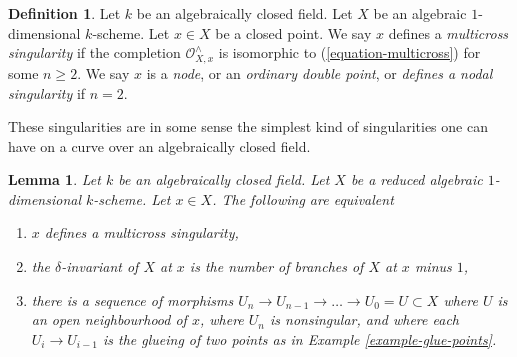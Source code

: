\documentclass{stacks-project}
\theoremstyle{plain}
\newtheorem{lemma}[subsection]{Lemma}
\theoremstyle{definition}
\newtheorem{definition}[subsection]{Definition}
\theoremstyle{remark}
\numberwithin{equation}{subsection}
\begin{document}
\begin{definition}
\label{definition-multicross}
Let $k$ be an algebraically closed field. Let $X$ be an algebraic
$1$-dimensional $k$-scheme. Let $x \in X$ be a closed point.
We say $x$ defines a {\it multicross singularity} if the completion
$\mathcal{O}_{X, x}^\wedge$
is isomorphic to (\ref{equation-multicross}) for some $n \geq 2$.
We say $x$ is a {\it node}, or an {\it ordinary double point}, or
{\it defines a nodal singularity} if $n = 2$.
\end{definition}

\noindent
These singularities are in some sense the simplest kind of singularities
one can have on a curve over an algebraically closed field.

\begin{lemma}
\label{lemma-multicross}
Let $k$ be an algebraically closed field. Let $X$ be a reduced algebraic
$1$-dimensional $k$-scheme. Let $x \in X$. The following are equivalent
\begin{enumerate}
\item $x$ defines a multicross singularity,
\item the $\delta$-invariant of $X$ at $x$ is the
number of branches of $X$ at $x$ minus $1$,
\item there is a sequence of morphisms
$U_n \to U_{n - 1} \to \ldots \to U_0 = U \subset X$
where $U$ is an open neighbourhood of $x$, where
$U_n$ is nonsingular, and where each $U_i \to U_{i - 1}$
is the glueing of two points as in Example \ref{example-glue-points}.
\end{enumerate}
\end{lemma}
\end{document}
